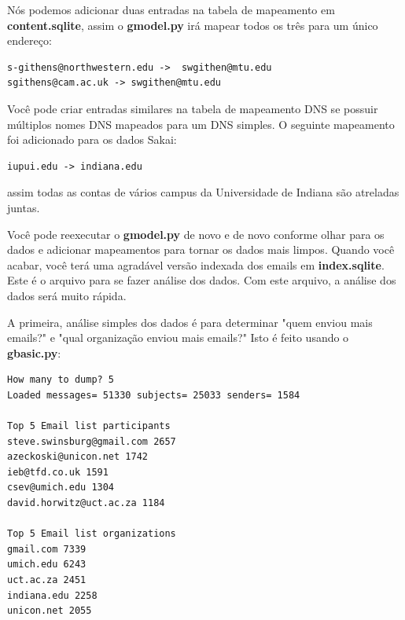 Nós podemos adicionar duas entradas na tabela de mapeamento em {\bf content.sqlite},
assim o {\bf gmodel.py} irá mapear todos os três para um único endereço: 

\beforeverb
\begin{verbatim}
s-githens@northwestern.edu ->  swgithen@mtu.edu
sgithens@cam.ac.uk -> swgithen@mtu.edu
\end{verbatim}
\afterverb
%

Você pode criar entradas similares na tabela de mapeamento DNS se possuir múltiplos
nomes DNS mapeados para um DNS simples. O seguinte mapeamento foi adicionado para os 
dados Sakai: 

\beforeverb
\begin{verbatim}
iupui.edu -> indiana.edu
\end{verbatim}
\afterverb
%

assim todas as contas de vários campus da Universidade de Indiana são atreladas juntas.

Você pode reexecutar o {\bf gmodel.py} de novo e de novo conforme olhar para os dados e 
adicionar mapeamentos para tornar os dados mais limpos. Quando você acabar, você terá uma
agradável versão indexada dos emails em {\bf index.sqlite}. Este é o arquivo para se fazer
análise dos dados. Com este arquivo, a análise dos dados será muito rápida. 

A primeira, análise simples dos dados é para determinar "quem enviou mais emails?" e 
"qual organização enviou mais emails?" Isto é feito usando o {\bf gbasic.py}:  

\beforeverb
\begin{verbatim}
How many to dump? 5
Loaded messages= 51330 subjects= 25033 senders= 1584

Top 5 Email list participants
steve.swinsburg@gmail.com 2657
azeckoski@unicon.net 1742
ieb@tfd.co.uk 1591
csev@umich.edu 1304
david.horwitz@uct.ac.za 1184

Top 5 Email list organizations
gmail.com 7339
umich.edu 6243
uct.ac.za 2451
indiana.edu 2258
unicon.net 2055
\end{verbatim}
\afterverb
%

